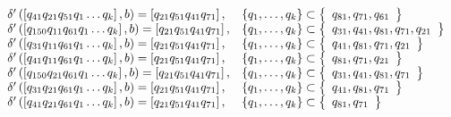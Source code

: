 \begin{align*}
\begin{array}{ll}
		\gendelta{q_{41}q_{21}q_{51}}{b}{q_{21}q_{51}q_{41}q_{71}}{q_{81},q_{71},q_{61}}                       \\
		\gendelta{q_{150}q_{11}q_{61}}{b}{q_{21}q_{51}q_{41}q_{71}}{q_{31},q_{41},q_{81},q_{71},q_{21}}        \\
		\gendelta{q_{31}q_{11}q_{61}}{b}{q_{21}q_{51}q_{41}q_{71}}{q_{41},q_{81},q_{71},q_{21}}                \\
		\gendelta{q_{41}q_{11}q_{61}}{b}{q_{21}q_{51}q_{41}q_{71}}{q_{81},q_{71},q_{21}}                       \\
		\gendelta{q_{150}q_{21}q_{61}}{b}{q_{21}q_{51}q_{41}q_{71}}{q_{31},q_{41},q_{81},q_{71}}               \\
		\gendelta{q_{31}q_{21}q_{61}}{b}{q_{21}q_{51}q_{41}q_{71}}{q_{41},q_{81},q_{71}}                       \\
		\gendelta{q_{41}q_{21}q_{61}}{b}{q_{21}q_{51}q_{41}q_{71}}{q_{81},q_{71}}                              \\
	\end{array}
\end{align*}
